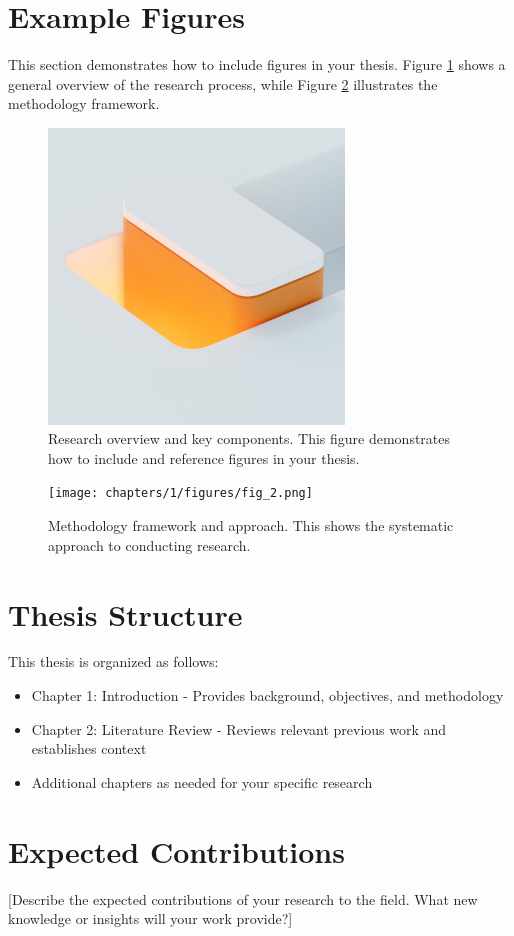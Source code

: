 \section{Example Figures}
This section demonstrates how to include figures in your thesis. Figure \ref{fig:research_overview} shows a general overview of the research process, while Figure \ref{fig:methodology} illustrates the methodology framework.

\begin{figure}[h!tbp]
\centering
\includegraphics[width=0.7\textwidth]{chapters/1/figures/fig_1.png}
\caption{Research overview and key components. This figure demonstrates how to include and reference figures in your thesis.}
\label{fig:research_overview}
\end{figure}

\begin{figure}[h!tbp]
\centering
\texttt{[image: chapters/1/figures/fig\_2.png]}
\caption{Methodology framework and approach. This shows the systematic approach to conducting research.}
\label{fig:methodology}
\end{figure}

\section{Thesis Structure}
This thesis is organized as follows:
\begin{itemize}
\item Chapter 1: Introduction - Provides background, objectives, and methodology
\item Chapter 2: Literature Review - Reviews relevant previous work and establishes context
\item Additional chapters as needed for your specific research
\end{itemize}

\section{Expected Contributions}
[Describe the expected contributions of your research to the field. What new knowledge or insights will your work provide?]
